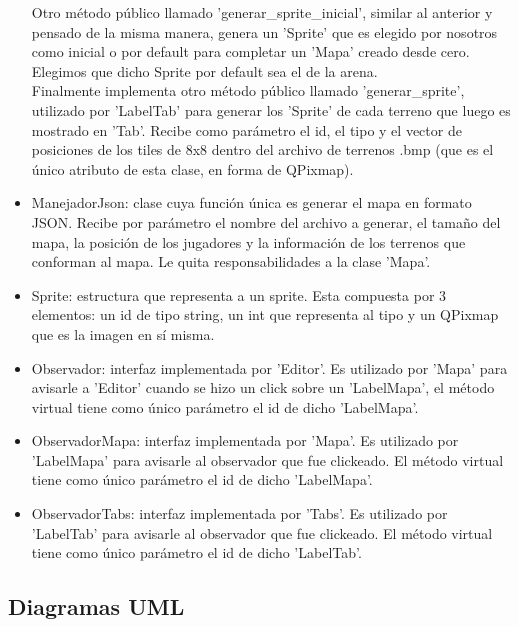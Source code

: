 \documentclass[titlepage,a4paper,12pt]{article}
\begin{document}
\begin{itemize}
Otro método público llamado 'generar\_sprite\_inicial', similar al anterior y pensado de la misma manera, genera un 'Sprite' que es elegido por nosotros como inicial o por default para completar un 'Mapa' creado desde cero. Elegimos que dicho Sprite por default sea el de la arena.\\

Finalmente implementa otro método público llamado 'generar\_sprite', utilizado por 'LabelTab' para generar los 'Sprite' de cada terreno que luego es mostrado en 'Tab'. Recibe como parámetro el id, el tipo y el vector de posiciones de los tiles de 8x8 dentro del archivo de terrenos .bmp (que es el único atributo de esta clase, en forma de QPixmap).

\item ManejadorJson: clase cuya función única es generar el mapa en formato JSON. Recibe por parámetro el nombre del archivo a generar, el tamaño del mapa, la posición de los jugadores y la información de los terrenos que conforman al mapa. Le quita responsabilidades a la clase 'Mapa'.

\item Sprite: estructura que representa a un sprite. Esta compuesta por 3 elementos: un id de tipo string, un int que representa al tipo y un QPixmap que es la imagen en sí misma.

\item Observador: interfaz implementada por 'Editor'. Es utilizado por 'Mapa' para avisarle a 'Editor' cuando se hizo un click sobre un 'LabelMapa', el método virtual tiene como único parámetro el id de dicho 'LabelMapa'.

\item ObservadorMapa: interfaz implementada por 'Mapa'. Es utilizado por 'LabelMapa' para avisarle al observador que fue clickeado. El método virtual tiene como único parámetro el id de dicho 'LabelMapa'. 

\item ObservadorTabs: interfaz implementada por 'Tabs'. Es utilizado por 'LabelTab' para avisarle al observador que fue clickeado. El método virtual tiene como único parámetro el id de dicho 'LabelTab'. 

\end{itemize}

\subsection{Diagramas UML}
\end{document}
